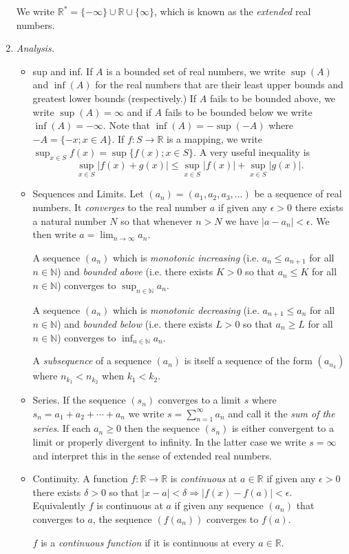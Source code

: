 \documentclass[a4paper]{report}
\numberwithin{equation}{chapter}
\numberwithin{thm_counter}{section}
\newcommand{\nN}{n \in \mathbb{N}}
\def\mb{\mathbb} %
\def\R{\mb{R}} %
\begin{document}
\begin{enumerate}
We write $\R^{*} = \{-\infty\} \cup \R \cup \{\infty\}$, which is known as the \textit{extended} real numbers.


\item {\it Analysis.}

\begin{itemize}

\item sup and inf. If $A$ is a bounded set of real numbers, we write $\sup(A)$ and $\inf(A)$ for the real numbers that are their least upper bounds and greatest lower bounds (respectively.) If $A$ fails to be bounded above, we write $\sup(A) = \infty$ and if $A$ fails to be bounded below we write $\inf(A) = - \infty$. Note that $\inf(A) = -\sup(-A)$ where $-A = \{-x; x \in A\}$. If $f: S \rightarrow \R$ is a mapping, we write $\sup_{x \in S}f(x)= \sup\{f(x); x \in S\}$. A very useful inequality is
    $$ \sup_{x \in S}|f(x) + g(x)| \leq \sup_{x \in S}|f(x)| + \sup_{x \in S}|g(x)|.$$

\item Sequences and Limits. Let $(a_{n}) = (a_{1}, a_{2}, a_{3}, \ldots)$ be a sequence of real numbers. It {\it converges} to the real number $a$ if given any $\epsilon > 0$ there exists a natural number $N$  so that whenever $n > N$ we have $|a - a_{n}| < \epsilon$.  We then write $a = \lim_{n \rightarrow \infty}a_{n}$.

A sequence $(a_{n})$ which is {\it monotonic increasing} (i.e. $a_{n} \leq a_{n+1}$ for all $\nN$) and {\it bounded above} (i.e. there exists $K > 0$ so that $a_{n} \leq K$ for all $\nN$) converges to $\sup_{\nN}a_{n}$.

A sequence $(a_{n})$ which is {\it monotonic decreasing} (i.e. $a_{n+1} \leq a_{n}$ for all $\nN$) and {\it bounded below} (i.e. there exists $L > 0$ so that $a_{n} \geq L$ for all $\nN$) converges to $\inf_{\nN}a_{n}$.

A {\it subsequence} of a sequence $(a_{n})$ is itself a sequence of the form $(a_{n_{k}})$ where $n_{k_{1}} < n_{k_{2}}$ when $k_{1} < k_{2}$.


\item Series. If the sequence $(s_{n})$ converges to a limit $s$ where $s_{n} = a_{1} + a_{2} + \cdots + a_{n}$ we write $s = \sum_{n=1}^{\infty}a_{n}$ and call it the {\it sum of the series}. If each $a_{n} \geq 0$ then the sequence $(s_{n})$ is either convergent to a limit or properly divergent to infinity. In the latter case we write $s = \infty$ and interpret this in the sense of extended real numbers.

\item Continuity. A function $f:\R \rightarrow \R$ is {\it continuous} at $a \in \R$ if given any $\epsilon > 0$ there exists $\delta > 0$ so that $|x - a| < \delta \Rightarrow |f(x) -f(a)| < \epsilon$. Equivalently $f$ is continuous at $a$ if given any sequence $(a_{n})$ that converges to $a$, the sequence $(f(a_{n}))$ converges to $f(a)$.

    $f$ is a {\it continuous function} if it is continuous at every $a \in \R$.

\end{itemize}


\end{enumerate}
\end{document}
